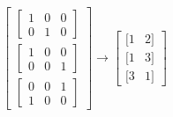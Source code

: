 \documentclass[10pt]{article}
\begin{document}
\[
\begin{bmatrix} 
\begin{bmatrix} 
1 & 0 & 0 \\
0 & 1 & 0 
\end{bmatrix} \\
\begin{bmatrix} 
1 & 0 & 0 \\
0 & 0 & 1
\end{bmatrix} \\
\begin{bmatrix} 
0 & 0 & 1 \\
1 & 0 & 0
\end{bmatrix}
\end{bmatrix}
\rightarrow
\begin{bmatrix}
[1 & 2]\\
[1 & 3]\\
[3 & 1]
\end{bmatrix}\]
\end{document}
